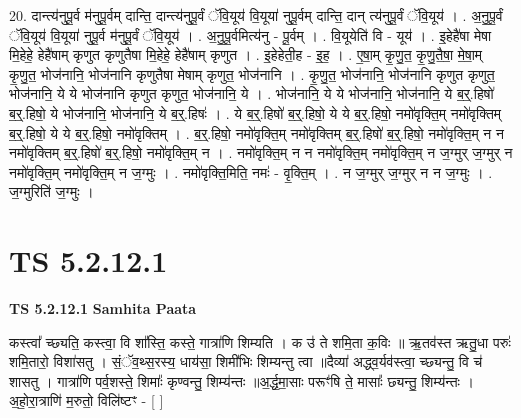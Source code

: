 \documentclass[17pt]{extarticle}
\begin{document}
20. दान्त्य॑नुपू॒र्व म॑नुपू॒र्वम् दान्ति॒ दान्त्य॑नुपू॒र्वं ॅवि॒यूय॑ वि॒यूया॑ नुपू॒र्वम् दान्ति॒ दान् त्य॑नुपू॒र्वं ॅवि॒यूय॑ । . अ॒नु॒पू॒र्वं ॅवि॒यूय॑ वि॒यूया॑ नुपू॒र्व म॑नुपू॒र्वं ॅवि॒यूय॑ । . अ॒नु॒पू॒र्वमित्य॑नु - पू॒र्वम् । . वि॒यूयेति॑ वि - यूय॑ । . इ॒हेहै॑षा मेषा मि॒हेहे॒ हेहै॑षाम् कृणुत कृणुतैषा मि॒हेहे॒ हेहै॑षाम् कृणुत । . इ॒हेहेती॒ह - इ॒ह॒ । . ए॒षा॒म् कृ॒णु॒त॒ कृ॒णु॒तै॒षा॒ मे॒षा॒म् कृ॒णु॒त॒ भोज॑नानि॒ भोज॑नानि कृणुतैषा मेषाम् कृणुत॒ भोज॑नानि । . कृ॒णु॒त॒ भोज॑नानि॒ भोज॑नानि कृणुत कृणुत॒ भोज॑नानि॒ ये ये भोज॑नानि कृणुत कृणुत॒ भोज॑नानि॒ ये । . भोज॑नानि॒ ये ये भोज॑नानि॒ भोज॑नानि॒ ये ब॒र्॒.हिषो॑ ब॒र्॒.हिषो॒ ये भोज॑नानि॒ भोज॑नानि॒ ये ब॒र्॒.हिषः॑ । . ये ब॒र्॒.हिषो॑ ब॒र्॒.हिषो॒ ये ये ब॒र्॒.हिषो॒ नमो॑वृक्ति॒म् नमो॑वृक्तिम् ब॒र्॒.हिषो॒ ये ये ब॒र्॒.हिषो॒ नमो॑वृक्तिम् । . ब॒र्॒.हिषो॒ नमो॑वृक्ति॒म् नमो॑वृक्तिम् ब॒र्॒.हिषो॑ ब॒र्॒.हिषो॒ नमो॑वृक्ति॒म् न न नमो॑वृक्तिम् ब॒र्॒.हिषो॑ ब॒र्॒.हिषो॒ नमो॑वृक्ति॒म् न । . नमो॑वृक्ति॒म् न न नमो॑वृक्ति॒म् नमो॑वृक्ति॒म् न ज॒ग्मुर् ज॒ग्मुर् न नमो॑वृक्ति॒म् नमो॑वृक्ति॒म् न ज॒ग्मुः । . नमो॑वृक्ति॒मिति॒ नमः॑ - वृ॒क्ति॒म् । . न ज॒ग्मुर् ज॒ग्मुर् न न ज॒ग्मुः । . ज॒ग्मुरिति॑ ज॒ग्मुः । \newline
\pagebreak
{}

\section{ TS 5.2.12.1 }

\textbf{TS 5.2.12.1 } \newline
\textbf{Samhita Paata} \newline

कस्त्वा᳚ च्छ्यति॒ कस्त्वा॒ वि शा᳚स्ति॒ कस्ते॒ गात्रा॑णि शिम्यति । क उ॑ ते शमि॒ता क॒विः ॥ ऋ॒तव॑स्त ऋतु॒धा परुः॑ शमि॒तारो॒ विशा॑सतु । सं॒ॅव॒थ्स॒रस्य॒ धाय॑सा॒ शिमी॑भिः शिम्यन्तु त्वा ॥दैव्या॑ अद्ध्व॒र्यव॑स्त्वा॒ च्छ्यन्तु॒ वि च॑ शासतु । गात्रा॑णि पर्व॒शस्ते॒ शिमाः᳚ कृण्वन्तु॒ शिम्य॑न्तः ॥अ॒र्द्ध॒मा॒साः परूꣳ॑षि ते॒ मासाः᳚ छ्यन्तु॒ शिम्य॑न्तः । अ॒हो॒रा॒त्राणि॑ म॒रुतो॒ विलि॑ष्टꣳ - [  ] \newline
\end{document}
